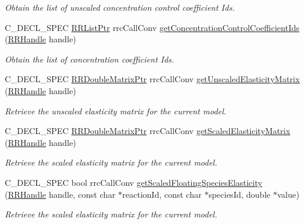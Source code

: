 \begin{DoxyCompactItemize}
\begin{DoxyCompactList}\small\item\em Obtain the list of unscaled concentration control coefficient Ids. \end{DoxyCompactList}\item 
C\+\_\+\+D\+E\+C\+L\+\_\+\+S\+P\+E\+C \hyperlink{rrc__types_8h_a32a8a60ac06858ff3a791672bd2bec73}{R\+R\+List\+Ptr} rrc\+Call\+Conv \hyperlink{group__mca_ga5d09e5709cba8b6496f3df5a17915c38}{get\+Concentration\+Control\+Coefficient\+Ids} (\hyperlink{rrc__types_8h_a1d68f0592372208fa5a5f2799ea4b3ae}{R\+R\+Handle} handle)
\begin{DoxyCompactList}\small\item\em Obtain the list of concentration coefficient Ids. \end{DoxyCompactList}\item 
C\+\_\+\+D\+E\+C\+L\+\_\+\+S\+P\+E\+C \hyperlink{rrc__types_8h_ae586a879d30f0823087e42d93464b5dd}{R\+R\+Double\+Matrix\+Ptr} rrc\+Call\+Conv \hyperlink{group__mca_ga27848ea67739637339d1c240c3d54a1b}{get\+Unscaled\+Elasticity\+Matrix} (\hyperlink{rrc__types_8h_a1d68f0592372208fa5a5f2799ea4b3ae}{R\+R\+Handle} handle)
\begin{DoxyCompactList}\small\item\em Retrieve the unscaled elasticity matrix for the current model. \end{DoxyCompactList}\item 
C\+\_\+\+D\+E\+C\+L\+\_\+\+S\+P\+E\+C \hyperlink{rrc__types_8h_ae586a879d30f0823087e42d93464b5dd}{R\+R\+Double\+Matrix\+Ptr} rrc\+Call\+Conv \hyperlink{group__mca_ga4b3e243893115cba0c1d20aa5b207343}{get\+Scaled\+Elasticity\+Matrix} (\hyperlink{rrc__types_8h_a1d68f0592372208fa5a5f2799ea4b3ae}{R\+R\+Handle} handle)
\begin{DoxyCompactList}\small\item\em Retrieve the scaled elasticity matrix for the current model. \end{DoxyCompactList}\item 
C\+\_\+\+D\+E\+C\+L\+\_\+\+S\+P\+E\+C bool rrc\+Call\+Conv \hyperlink{group__mca_gaba5b9bdc9edb663e6563e6ce836481ef}{get\+Scaled\+Floating\+Species\+Elasticity} (\hyperlink{rrc__types_8h_a1d68f0592372208fa5a5f2799ea4b3ae}{R\+R\+Handle} handle, const char $\ast$reaction\+Id, const char $\ast$species\+Id, double $\ast$value)
\begin{DoxyCompactList}\small\item\em Retrieve the scaled elasticity matrix for the current model. \end{DoxyCompactList}\item 

\end{DoxyCompactItemize}

